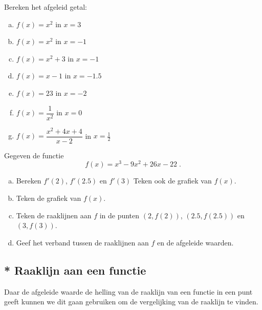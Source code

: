 \documentclass[a4paper,12pt,twoside]{article}
\begin{document}
\begin{oefening}
  Bereken het afgeleid getal:
  \begin{enumerate}[(a)]
    \itemsep.5em
  \item $f(x)=x^2$ in $x=3$
  \item $f(x)=x^2$ in $x=-1$
  \item $f(x)=x^2+3$ in $x=-1$
  \item $f(x)=x-1$ in $x=-1.5$
  \item $f(x)=23$ in $x=-2$
  \item $f(x)=\dfrac{1}{x^2}$ in $x=0$
  \item $f(x)=\dfrac{x^2+4x+4}{x-2}$ in $x=\frac{1}{2}$
  \end{enumerate}
\end{oefening}

\begin{oefening}
  Gegeven de functie
  $$f(x)=x^3-9x^2+26x-22\;.$$
  \begin{enumerate}[(a)]
  \item Bereken $f'(2)$, $f'(2.5)$ en $f'(3)$ Teken ook de grafiek van $f(x)$.
  \item Teken de grafiek van $f(x)$.
  \item Teken de raaklijnen aan $f$ in de punten $(2, f(2))$, $(2.5, f(2.5))$ en $(3, f(3))$.
  \item Geef het verband tussen de raaklijnen aan $f$ en de afgeleide waarden.
  \end{enumerate}
\end{oefening}

\subsection{* Raaklijn aan een functie}

Daar de afgeleide waarde de helling van de raaklijn van een functie in een punt geeft kunnen we dit gaan gebruiken om de vergelijking van de raaklijn te vinden.
\end{document}
